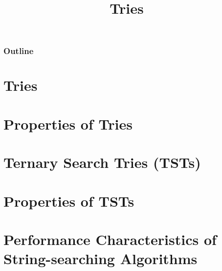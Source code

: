 \documentclass[8pt,a4paper,compress]{beamer}
\title{Tries}
\date{}
\begin{document}
\begin{frame}
\vfill
\titlepage
\end{frame}

\begin{frame}
\frametitle{Outline}
\tableofcontents
\end{frame}

\section{Tries}
\begin{frame}[fragile]
\pause

\end{frame}

\section{Properties of Tries}
\begin{frame}[fragile]
\pause

\end{frame}

\section{Ternary Search Tries (TSTs)}
\begin{frame}[fragile]
\pause

\end{frame}


\section{Properties of TSTs}
\begin{frame}[fragile]
\pause

\end{frame}

\section{Performance Characteristics of String-searching Algorithms}
\begin{frame}[fragile]
\pause

\end{frame}
\end{document}
